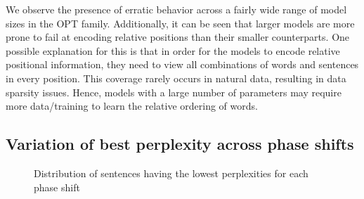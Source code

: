 \documentclass[letterpaper, 12pt]{report}
\begin{document}
We observe the presence of erratic behavior across a fairly wide range of model sizes in the OPT family. Additionally, it can be seen that larger models are more prone to fail at encoding relative positions than their smaller counterparts.
One possible explanation for this is that in order for the models to encode relative positional information, they need to view all combinations of words and sentences in every position. This coverage rarely occurs in natural data, resulting in data sparsity issues. Hence, models with a large number of parameters may require more data/training to learn the relative ordering of words.

\subsection{Variation of best perplexity across phase shifts}
\label{sec:pos_perplexity_phase}

\begin{figure}[!ht]
    \centering
    \caption{Distribution of sentences having the lowest perplexities for each phase shift}
    \label{fig:ppl_density}
\end{figure}
\end{document}

